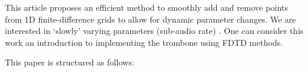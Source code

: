 This article proposes an efficient method to smoothly add and remove points from 1D finite-difference grids to allow for dynamic parameter changes. We are interested in `slowly' varying parameters (sub-audio rate) . One can consider this work an introduction to implementing the trombone using FDTD methods.

 This paper is structured as follows:
